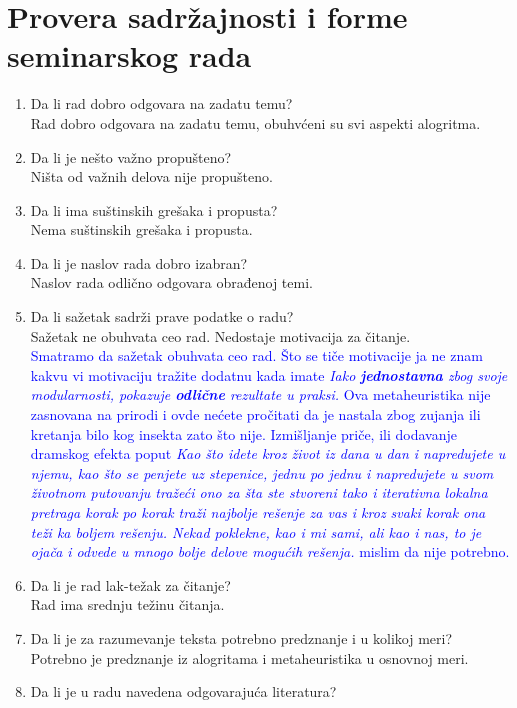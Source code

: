 \documentclass[a4paper]{report}
\newcommand{\odgovor}[1]{\textcolor{blue}{#1}}
\begin{document}
\section{Provera sadržajnosti i forme seminarskog rada}


\begin{enumerate}
\item Da li rad dobro odgovara na zadatu temu?\\
Rad dobro odgovara na zadatu temu, obuhvćeni su svi aspekti alogritma.
\item Da li je nešto važno propušteno?\\
Ništa od važnih delova nije propušteno.
\item Da li ima suštinskih grešaka i propusta?\\
Nema suštinskih grešaka i propusta.
\item Da li je naslov rada dobro izabran?\\
Naslov rada odlično odgovara obrađenoj temi.
\item Da li sažetak sadrži prave podatke o radu?\\
Sažetak ne obuhvata ceo rad. Nedostaje motivacija za čitanje.\\
\odgovor{Smatramo da sažetak obuhvata ceo rad. Što se tiče motivacije ja ne znam kakvu vi motivaciju tražite dodatnu kada imate \textit{Iako \textbf{jednostavna} zbog svoje modularnosti, pokazuje \textbf{odlične} rezultate u praksi.} Ova metaheuristika nije zasnovana na prirodi i ovde nećete pročitati 
da je nastala zbog zujanja ili kretanja bilo kog insekta zato što nije. Izmišljanje priče, ili dodavanje dramskog efekta poput \textit{Kao što idete kroz život iz dana u dan i napredujete u njemu, kao što se penjete uz stepenice, jednu po jednu i napredujete u svom životnom putovanju tražeći ono za šta ste stvoreni tako i iterativna lokalna pretraga korak po korak traži najbolje rešenje za vas i kroz 
svaki korak ona teži ka boljem rešenju. Nekad poklekne, kao i mi sami, ali kao i nas, to je ojača i odvede u mnogo bolje delove mogućih rešenja.} mislim da nije potrebno.\\}
\item Da li je rad lak-težak za čitanje?\\
Rad ima srednju težinu čitanja.
\item Da li je za razumevanje teksta potrebno predznanje i u kolikoj meri?\\
Potrebno je predznanje iz alogritama i metaheuristika u osnovnoj meri.
\item Da li je u radu navedena odgovarajuća literatura?\\

\end{enumerate}
\end{document}
